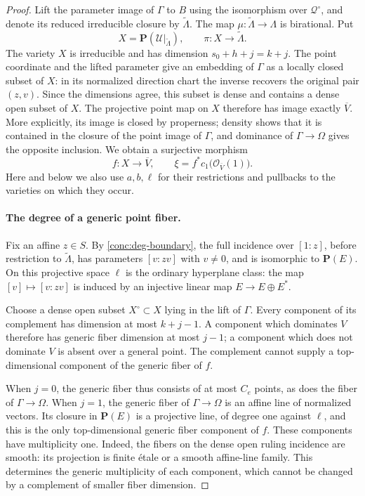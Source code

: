 \begin{proof}
Lift the parameter image of \(\Gamma\) to \(B\) using the
isomorphism over \(\mathcal Q^\circ\), and denote its reduced
irreducible closure by \(\widetilde\Lambda\).  The map
\(\mu:\widetilde\Lambda\to\Lambda\) is birational.  Put
\[
 X=\mathbf{P}(\mathcal U|_{\widetilde\Lambda}),
 \qquad \pi:X\longrightarrow\widetilde\Lambda.
\]
The variety \(X\) is irreducible and has dimension
\(s_0+h+j=k+j\).  The point coordinate and the lifted parameter
give an embedding of \(\Gamma\) as a locally closed subset of
\(X\): in its normalized direction chart the inverse recovers
the original pair \((z,v)\).  Since the dimensions agree, this
subset is dense and contains a dense open subset of \(X\).
The projective point map on \(X\) therefore has image exactly
\(\overline V\).  More explicitly, its image is closed by
properness; density shows that it is contained in the closure of
the point image of \(\Gamma\), and dominance of
\(\Gamma\to\Omega\) gives the opposite inclusion.  We obtain
a surjective morphism
\[
 f:X\longrightarrow\overline V,
 \qquad
 \xi=f^*c_1\bigl(\mathcal O_{\overline V}(1)\bigr).
\]
Here and below we also use \(a,b,\ell\) for their restrictions
and pullbacks to the varieties on which they occur.

\paragraph{The degree of a generic point fiber.}
Fix an affine \(z\in S\).  By \eqref{conc:deg-boundary}, the
full incidence over \([1:z]\), before restriction to
\(\widetilde\Lambda\), has parameters \([v:zv]\) with
\(v\ne0\), and is isomorphic to \(\mathbf{P}(E)\).
On this projective space \(\ell\) is the ordinary hyperplane
class: the map \([v]\mapsto[v:zv]\) is induced by an injective
linear map \(E\to E\oplus E^*\).

Choose a dense open subset \(X^\circ\subset X\) lying in the
lift of \(\Gamma\).  Every component of its complement has
dimension at most \(k+j-1\).  A component which dominates
\(V\) therefore has generic fiber dimension at most \(j-1\);
a component which does not dominate \(V\) is absent over a
general point.  The complement cannot supply a top-dimensional
component of the generic fiber of \(f\).

When \(j=0\), the generic fiber thus consists of at most \(C_e\)
points, as does the fiber of \(\Gamma\to\Omega\).  When
\(j=1\), the generic fiber of \(\Gamma\to\Omega\) is an
affine line of normalized vectors.  Its closure in \(\mathbf{P}(E)\)
is a projective line, of degree one against \(\ell\), and this
is the only top-dimensional generic fiber component of \(f\).
These components have multiplicity one.  Indeed, the fibers on
the dense open ruling incidence are smooth: its projection is
finite \'etale or a smooth affine-line family.  This determines
the generic multiplicity of each component, which cannot be
changed by a complement of smaller fiber dimension.


\end{proof}
